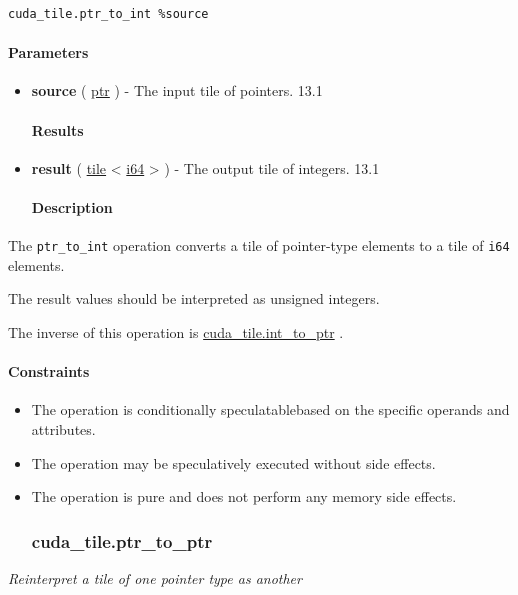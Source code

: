 \documentclass{article}
\begin{document}
\begin{lstlisting}
cuda_tile.ptr_to_int %source
\end{lstlisting}

\paragraph{Parameters}

\begin{itemize}
\item \textbf{source} ( \href{https://docs.nvidia.com/cuda/tile-ir/latest/sections/types.html#type-ptr}{ptr} ) - The input tile of pointers. 13.1


\paragraph{Results}

\item \textbf{result} ( \href{https://docs.nvidia.com/cuda/tile-ir/latest/sections/types.html#type-tile}{tile} < \href{https://docs.nvidia.com/cuda/tile-ir/latest/sections/types.html#subsection-element-types}{i64} > ) - The output tile of integers. 13.1


\paragraph{Description}

\end{itemize}
The \texttt{ptr\_to\_int} operation converts a tile of pointer-type elements to a tile of \texttt{i64} elements.


The result values should be interpreted as unsigned integers.


The inverse of this operation is \href{https://docs.nvidia.com/cuda/tile-ir/latest/sections/operations.html#op-cuda-tile-int-to-ptr}{cuda\_tile.int\_to\_ptr} .



\paragraph{Constraints}

\begin{itemize}
\item The operation is conditionally speculatablebased on the specific operands and attributes.
\item The operation may be speculatively executed without side effects.
\item The operation is pure and does not perform any memory side effects.


\subsubsection{cuda\_tile.ptr\_to\_ptr}

\end{itemize}
\textit{Reinterpret a tile of one pointer type as another}
\end{document}
